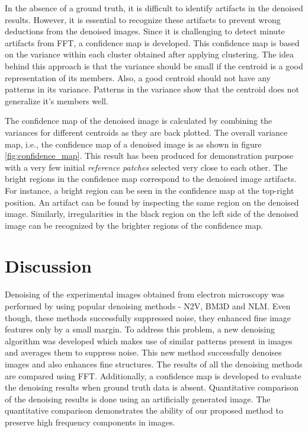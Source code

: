 \documentclass[fleqn,10pt]{wlscirep}
\begin{document}
	In the absence of a ground truth, it is difficult to identify artifacts in the denoised results. However, it is essential to recognize these artifacts to prevent wrong deductions from the denoised images. Since it is challenging to detect minute artifacts from FFT, a confidence map is developed. This confidence map is based on the variance within each cluster obtained after applying clustering. The idea behind this approach is that the variance should be small if the centroid is a good representation of its members. Also, a good centroid should not have any patterns in its variance. Patterns in the variance show that the centroid does not generalize it's members well. 
	
	The confidence map of the denoised image is calculated by combining the variances\cite{chan1982updating} for different centroids as they are back plotted. The overall variance map, i.e., the confidence map of a denoised image is as shown in figure \ref{fig:confidence_map}. This result has been produced for demonstration purpose with a very few initial \textit{reference patches} selected very close to each other. The bright regions in the confidence map correspond to the denoised image artifacts. For instance, a bright region can be seen in the confidence map at the top-right position. An artifact can be found by inspecting the same region on the denoised image. Similarly, irregularities in the black region on the left side of the denoised image can be recognized by the brighter regions of the confidence map.
	

	
	\section*{Discussion}
	
	Denoising of the experimental images obtained from electron microscopy was performed by using popular denoising methods - N2V, BM3D and NLM. Even though, these methods successfully suppressed noise, they enhanced fine image features only by a small margin. To address this problem, a new denoising algorithm was developed which makes use of similar patterns present in images and averages them to suppress noise. This new method successfully denoises images and also enhances fine structures. The results of all the denoising methods are compared using FFT. Additionally, a confidence map is developed to evaluate the denoising results when ground truth data is absent. Quantitative comparison of the denoising results is done using an artificially generated image. The quantitative comparison demonstrates the ability of our proposed method to preserve high frequency components in images.  
	
\end{document}
